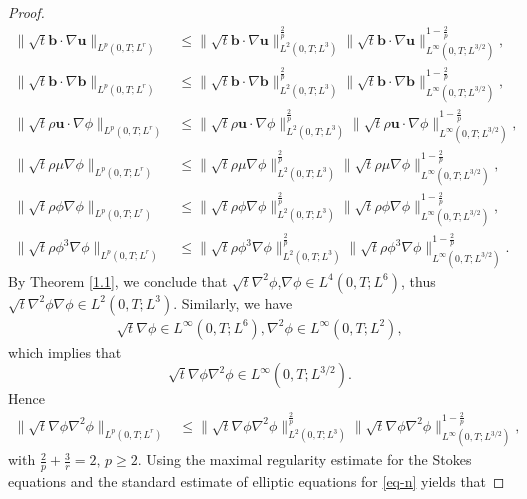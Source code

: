 \documentclass[10pt,a4paper]{amsart}
\begin{document}
\begin{proof}
\begin{align*}
\|\sqrt{t}\mathbf{b} \cdot \nabla \mathbf{u}\|_{L^p(0,T;L^r)} &\leq \|\sqrt{t} \mathbf{b} \cdot \nabla \mathbf{u}\|_{L^2(0,T;L^3)}^{\frac{2}{p}} \|\sqrt{t} \mathbf{b} \cdot \nabla \mathbf{u}\|_{L^\infty(0,T;L^{3/2})}^{1 - \frac{2}{p}}, \\
\|\sqrt{t}\mathbf{b} \cdot \nabla \mathbf{b}\|_{L^p(0,T;L^r)} &\leq \|\sqrt{t} \mathbf{b} \cdot \nabla \mathbf{b}\|_{L^2(0,T;L^3)}^{\frac{2}{p}} \|\sqrt{t} \mathbf{b} \cdot \nabla \mathbf{b}\|_{L^\infty(0,T;L^{3/2})}^{1 - \frac{2}{p}}, \\
\|\sqrt{t}\rho \mathbf{u} \cdot\nabla \phi\|_{L^p(0,T;L^r)} &\leq \|\sqrt{t}\rho \mathbf{u}\cdot\nabla \phi\|_{L^2(0,T;L^3)}^{\frac{2}{p}} \|\sqrt{t}\rho \mathbf{u} \cdot\nabla \phi\|_{L^\infty(0,T;L^{3/2})}^{1 - \frac{2}{p}},\\
\|\sqrt{t}\rho \mu\nabla \phi\|_{L^p(0,T;L^r)} &\leq \|\sqrt{t}\rho \mu\nabla \phi\|_{L^2(0,T;L^3)}^{\frac{2}{p}} \|\sqrt{t}\rho \mu\nabla \phi\|_{L^\infty(0,T;L^{3/2})}^{1 - \frac{2}{p}},\\
\|\sqrt{t}\rho \phi\nabla \phi\|_{L^p(0,T;L^r)} &\leq \|\sqrt{t}\rho \phi\nabla \phi\|_{L^2(0,T;L^3)}^{\frac{2}{p}} \|\sqrt{t}\rho \phi\nabla \phi\|_{L^\infty(0,T;L^{3/2})}^{1 - \frac{2}{p}},\\
\|\sqrt{t}\rho \phi^3\nabla \phi\|_{L^p(0,T;L^r)} &\leq \|\sqrt{t}\rho \phi^3\nabla \phi\|_{L^2(0,T;L^3)}^{\frac{2}{p}} \|\sqrt{t}\rho \phi^3\nabla \phi\|_{L^\infty(0,T;L^{3/2})}^{1 - \frac{2}{p}}.
\end{align*}
By Theorem  \ref{1.1}, we conclude that
$\sqrt{t}\nabla^2\phi$,$\nabla\phi \in L^4(0, T; L^6)$,
thus
$\sqrt{t}\nabla^2\phi\nabla\phi \in L^2(0, T; L^3)$.
Similarly, we have
\begin{align*}
\sqrt{t}\nabla\phi\in L^\infty(0,T;L^6) ,
\nabla^2\phi\in L^\infty(0,T;L^2),
\end{align*}
which implies that
\begin{equation*}
\sqrt{t}\nabla\phi\nabla^2\phi\in L^\infty(0, T; L^{3/2}).
\end{equation*}
Hence
\begin{align*}
\|\sqrt{t} \nabla \phi\nabla^2\phi\|_{L^p(0,T;L^r)} &\leq \|\sqrt{t} \nabla \phi\nabla^2\phi\|_{L^2(0,T;L^3)}^{\frac{2}{p}} \|\sqrt{t} \nabla \phi\nabla^2\phi\|_{L^\infty(0,T;L^{3/2})}^{1 - \frac{2}{p}},
\end{align*}
with \(\frac{2}{p} + \frac{3}{r} = 2,\, p \geq 2\). Using the maximal regularity estimate for the Stokes equations and the standard estimate of elliptic equations for \eqref{eq-n} yields that

\end{proof}
\end{document}
